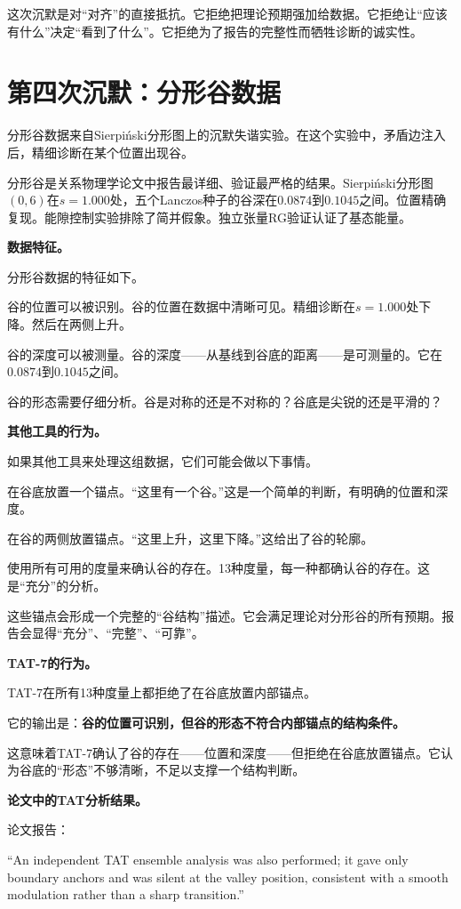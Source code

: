 \documentclass[11pt,a4paper]{book}
\theoremstyle{definition}
\begin{document}
这次沉默是对“对齐”的直接抵抗。它拒绝把理论预期强加给数据。它拒绝让“应该有什么”决定“看到了什么”。它拒绝为了报告的完整性而牺牲诊断的诚实性。

\section{第四次沉默：分形谷数据}

分形谷数据来自Sierpiński分形图上的沉默失谐实验。在这个实验中，矛盾边注入后，精细诊断在某个位置出现谷。

分形谷是关系物理学论文中报告最详细、验证最严格的结果。Sierpiński分形图$(0,6)$在$s=1.000$处，五个Lanczos种子的谷深在$0.0874$到$0.1045$之间。位置精确复现。能隙控制实验排除了简并假象。独立张量RG验证认证了基态能量。

\textbf{数据特征。}

分形谷数据的特征如下。

谷的位置可以被识别。谷的位置在数据中清晰可见。精细诊断在$s=1.000$处下降。然后在两侧上升。

谷的深度可以被测量。谷的深度——从基线到谷底的距离——是可测量的。它在$0.0874$到$0.1045$之间。

谷的形态需要仔细分析。谷是对称的还是不对称的？谷底是尖锐的还是平滑的？

\textbf{其他工具的行为。}

如果其他工具来处理这组数据，它们可能会做以下事情。

在谷底放置一个锚点。“这里有一个谷。”这是一个简单的判断，有明确的位置和深度。

在谷的两侧放置锚点。“这里上升，这里下降。”这给出了谷的轮廓。

使用所有可用的度量来确认谷的存在。13种度量，每一种都确认谷的存在。这是“充分”的分析。

这些锚点会形成一个完整的“谷结构”描述。它会满足理论对分形谷的所有预期。报告会显得“充分”、“完整”、“可靠”。

\textbf{TAT-7的行为。}

TAT-7在所有13种度量上都拒绝了在谷底放置内部锚点。

它的输出是：\textbf{谷的位置可识别，但谷的形态不符合内部锚点的结构条件。}

这意味着TAT-7确认了谷的存在——位置和深度——但拒绝在谷底放置锚点。它认为谷底的“形态”不够清晰，不足以支撑一个结构判断。

\textbf{论文中的TAT分析结果。}

论文报告：

“An independent TAT ensemble analysis was also performed; it gave only boundary anchors and was silent at the valley position, consistent with a smooth modulation rather than a sharp transition.”
\end{document}
